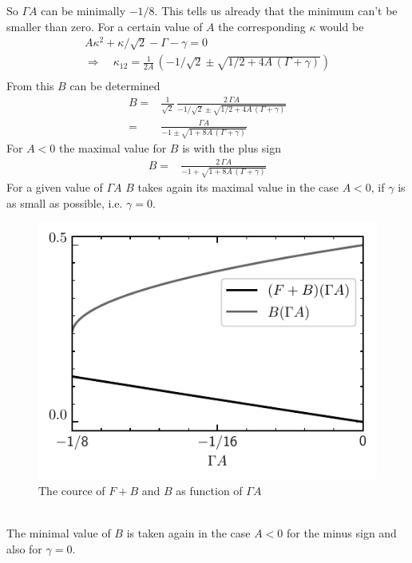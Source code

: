 \documentclass{article}
\begin{document}
So $\Gamma A$ can be minimally $-1/8$. This tells us already that the minimum can't be smaller than zero. For a certain value of $A$ the corresponding $\kappa$ would be
\begin{align*}
    A\kappa^2+\kappa/\sqrt{2}-\Gamma-\gamma=0\\
    \Rightarrow\quad \kappa_{12}=\frac{1}{2A}\,\left(-1/\sqrt{2}\pm\sqrt{1/2+4A\,(\Gamma+\gamma)}\right)\\
\end{align*}
From this $B$ can be determined
\begin{align*}
    B=&\frac{1}{\sqrt{2}}\,\frac{2\,\Gamma A}{-1/\sqrt{2}\pm\sqrt{1/2+4A\,(\Gamma+\gamma)}}\\
    =&\frac{\Gamma A}{-1\pm\sqrt{1+8A\,(\Gamma+\gamma)}}
\end{align*}
For $A<0$ the maximal value for $B$ is with the plus sign
\begin{align*}
    B=&\frac{2\,\Gamma A}{-1+\sqrt{1+8A\,(\Gamma+\gamma)}}
\end{align*}
For a given value of $\Gamma A$ $B$ takes again its maximal value in the case $A<0$, if $\gamma$ is as small as possible, i.e. $\gamma=0$.
\begin{figure}
    \includegraphics{pictures/k=w_F|B_numn_of_fixp.pdf}
    \vspace*{-2cm}\caption{The cource of $F+B$ and $B$ as function of $\Gamma A$}
    \label{fig:k=w_numb_of_fixp}
\end{figure}\\
The minimal value of $B$ is taken again in the case $A<0$ for the minus sign and also for $\gamma=0$.\\
\end{document}
